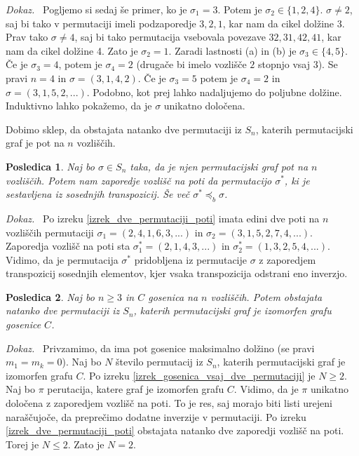 \documentclass[a4paper, 12pt]{book}
\newtheorem{posledica}{Posledica}[chapter]
\newenvironment{dokaz}{\emph{Dokaz.}\ }{\hspace{\fill}{$\Box$}}
\begin{document}
\begin{dokaz}
    Pogljemo si sedaj še primer, ko je $\sigma_1 = 3$. Potem je $\sigma_2 \in \{ 1, 2, 4\}$. $\sigma \neq 2$, saj bi tako v permutaciji imeli podzaporedje $3, 2, 1$, kar nam da cikel dolžine 3. Prav tako $\sigma \neq 4$, saj bi tako permutacija vsebovala povezave $32, 31, 42, 41$, kar nam da cikel dolžine 4. Zato je $\sigma_2 = 1$. Zaradi lastnosti (a) in (b) je $\sigma_3 \in \{ 4, 5 \}$. Če je $\sigma_3 = 4$, potem je $\sigma_4 = 2$ (drugače bi imelo vozlišče $2$ stopnjo vsaj $3$). Se pravi $n = 4$ in $\sigma = (3, 1, 4, 2)$. Če je $\sigma_3 = 5$ potem je $\sigma_4 = 2$ in $\sigma = (3, 1, 5, 2,...)$. Podobno, kot prej lahko nadaljujemo do poljubne dolžine. Induktivno lahko pokažemo, da je $\sigma$ unikatno določena.

    Dobimo sklep, da obstajata natanko dve permutaciji iz $S_n$, katerih permutacijski graf je pot na $n$ vozliščih.
\end{dokaz}

\begin{posledica}
    Naj bo $\sigma \in S_n$ taka, da je njen permutacijski graf pot na $n$ vozliščih. Potem nam zaporedje vozlišč na poti da permutacijo $\sigma^*$, ki je sestavljena iz sosednjih transpozicij. Še več $\sigma^* \preceq_b \sigma$.
\end{posledica}
\begin{dokaz}
    Po izreku \ref{izrek_dve_permutaciji_poti} imata edini dve poti na $n$ vozliščih permutaciji $\sigma_1 = (2, 4, 1, 6, 3,...)$ in $\sigma_2 = (3, 1, 5, 2, 7, 4,...)$. Zaporedja vozlišč na poti sta $\sigma_1^* = (2, 1, 4, 3,...)$ in $\sigma_2^* = (1, 3, 2, 5, 4,...)$. Vidimo, da je permutacija $\sigma^*$ pridobljena iz permutacije $\sigma$ z zaporedjem transpozicij sosednjih elementov, kjer vsaka transpozicija odstrani eno inverzjo.
\end{dokaz}

\begin{posledica}    
    Naj bo $n \geq 3$ in $C$ gosenica na $n$ vozliščih. Potem obstajata natanko dve permutaciji iz $S_n$, katerih permutacijski graf je izomorfen grafu gosenice $C$.
\end{posledica}
\begin{dokaz}
    Privzamimo, da ima pot gosenice maksimalno dolžino (se pravi $m_1 = m_k = 0$). Naj bo $N$ število permutacij iz $S_n$, katerih permutacijski graf je izomorfen grafu $C$. Po izreku \ref{izrek_gosenica_vsaj_dve_permutaciji} je $N \geq 2$. Naj bo $\pi$ perutacija, katere graf je izomorfen grafu $C$. Vidimo, da je $\pi$ unikatno določena z zaporedjem vozlišč na poti. To je res, saj morajo biti listi urejeni naraščujoče, da preprečimo dodatne inverzije v permutaciji. Po izreku \ref{izrek_dve_permutaciji_poti} obstajata natanko dve zaporedji vozlišč na poti. Torej je $N \leq 2$. Zato je $N = 2$.
\end{dokaz}
\end{document}
